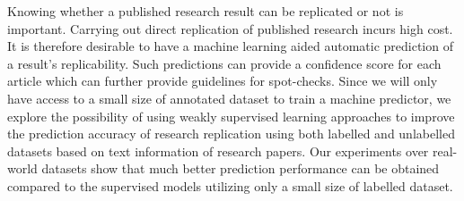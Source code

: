 Knowing whether a published research result can be replicated or not is important. Carrying out direct replication of published research incurs high cost. It is therefore desirable to have a machine learning aided automatic prediction of a result's replicability. Such predictions can provide a confidence score for each article which can further provide guidelines for spot-checks. Since we will only have access to a small size of annotated dataset to train a machine predictor, we explore the possibility of using weakly supervised learning approaches to improve the prediction accuracy of research replication using both labelled and unlabelled datasets based on text information of research papers. Our experiments over real-world datasets show that much better prediction performance can be obtained compared to the supervised models utilizing only a small size of labelled dataset.
